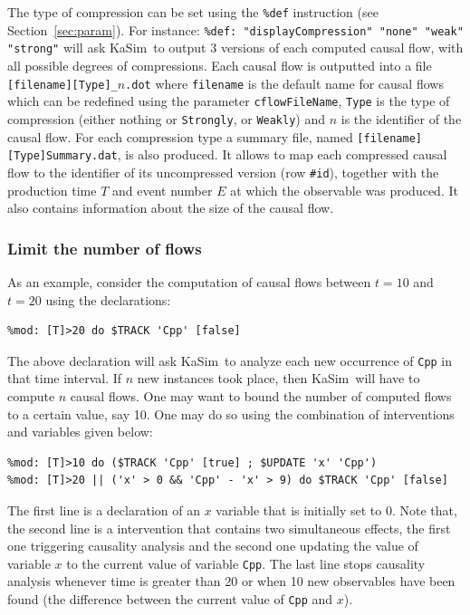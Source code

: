 \documentclass[11pt]{book}
\def\KaSim{\textsf{KaSim}}
\def\ttt#1{\texttt{#1}}
\def\var#1{{\textquotesingle}#1{\textquotesingle}}
\begin{document}
The type of compression can be set using the \texttt{\%def} instruction (see Section~\ref{sec:param}). For instance:
\lstinline[language=kappa]!%def: "displayCompression" "none" "weak" "strong"!
will ask \KaSim~to output 3 versions of each computed causal flow, with all possible degrees of compressions. Each causal flow is outputted into a file \texttt{[filename][Type]\_$n$.dot} where \texttt{filename} is the default name for causal flows which can be redefined using the parameter \texttt{cflowFileName}, \texttt{Type} is the type of compression (either nothing or \texttt{Strongly}, or \texttt{Weakly}) and $n$ is the identifier of the causal flow. For each compression type a summary file, named \texttt{[filename][Type]Summary.dat}, is also produced. It allows to map each compressed causal flow to the identifier of its uncompressed version (row \texttt{\#id}), together with the production time $T$ and event number $E$ at which the observable was produced. It also contains information about the size of the causal flow.

\subsubsection{Limit the number of flows}
As an example, consider the computation of causal flows between $t=10$ and $t=20$ using the declarations:
\begin{lstlisting}[language=kappa]
%mod: [T]>10 do $TRACK 'Cpp' [true]
%mod: [T]>20 do $TRACK 'Cpp' [false]
\end{lstlisting}

The above declaration will ask \KaSim~to analyze each new occurrence of \ttt{\var{Cpp}} in that time interval. If $n$ new instances took place, then \KaSim~will have to compute $n$ causal flows. One may want to bound the number of computed flows to a certain value, say 10. One may do so using the combination of interventions and variables given below:
\begin{lstlisting}[language=kappa]
%var: 'x' 0
%mod: [T]>10 do ($TRACK 'Cpp' [true] ; $UPDATE 'x' 'Cpp')
%mod: [T]>20 || ('x' > 0 && 'Cpp' - 'x' > 9) do $TRACK 'Cpp' [false]
\end{lstlisting}
The first line is a declaration of an $x$ variable that is initially set to 0. Note that, the second line is a intervention that contains two simultaneous effects, the first one triggering causality analysis and the second one updating the value of variable $x$ to the current value of variable \ttt{\var{Cpp}}.
The last line stops causality analysis whenever time is greater than 20 or when 10 new observables have been found (the difference between the current value of \ttt{\var{Cpp}} and $x$).
\end{document}
